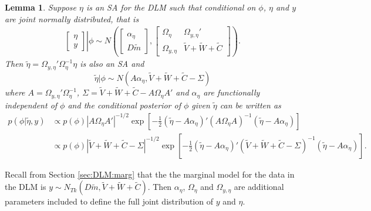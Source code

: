 \documentclass[12pt]{article}
\newtheorem{lem}{Lemma}
\begin{document}
\begin{lem}\label{noSA}
Suppose $\eta$ is an SA for the DLM such that conditional on $\phi$, $\eta$ and $y$ are joint normally distributed, that is
\begin{align*}
 \left. \begin{bmatrix}\eta \\ y \end{bmatrix}\right|\phi \sim N\left(\begin{bmatrix} \alpha_\eta \\ D\tilde{m} \end{bmatrix}, \begin{bmatrix}
   \Omega_\eta & \Omega_{y,\eta}' \\
   \Omega_{y,\eta} & \tilde{V} + \tilde{W} + \tilde{C} \end{bmatrix}\right).
\end{align*}
Then $\tilde{\eta}=\Omega_{y,\eta}'\Omega_{\eta}^{-1}\eta$ is also an SA and
\[
\tilde{\eta}|\phi \sim N(A\alpha_{\eta},\tilde{V} + \tilde{W} + \tilde{C} - \Sigma)
\]
where $A=\Omega_{y,\eta}'\Omega_{\eta}^{-1}$, $\Sigma = \tilde{V} + \tilde{W} + \tilde{C} - A\Omega_{\eta}A'$ and $\alpha_{\eta}$ are functionally independent of $\phi$ and the conditional posterior of $\phi$ given $\tilde{\eta}$ can be written as
\begin{align*}
p(\phi|\tilde{\eta},y) &\propto p(\phi) |A\Omega_{\eta}A'|^{-1/2}\exp\left[-\frac{1}{2}(\tilde{\eta}-A\alpha_{\eta})'(A\Omega_{\eta}A)^{-1}(\tilde{\eta}-A\alpha_{\eta})\right]\\
&\propto p(\phi)|\tilde{V} + \tilde{W} + \tilde{C} - \Sigma|^{-1/2}\exp\left[-\frac{1}{2}(\tilde{\eta} - A\alpha_{\eta})'(\tilde{V} + \tilde{W} + \tilde{C} - \Sigma)^{-1}(\tilde{\eta} - A\alpha_{\eta})\right].
\end{align*}
\end{lem}
\noindent Recall from Section \ref{sec:DLM:marg} that the the marginal model for the data in the DLM is $y\sim N_{Tk}(D\tilde{m}, \tilde{V} + \tilde{W} + \tilde{C})$. Then $\alpha_\eta$, $\Omega_\eta$ and $\Omega_{y,\eta}$ are additional parameters included to define the full joint distribution of $y$ and $\eta$.
\end{document}
